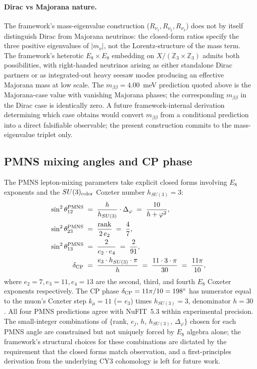 ﻿\documentclass[reprint,amsmath,amssymb,aps,prd,longbibliography,floatfix]{revtex4-2}
\providecommand{\degree}{^{\circ}}
\begin{document}
\paragraph{Dirac vs Majorana nature.}
The framework's mass-eigenvalue construction ($R_{\nu_1}, R_{\nu_2},
R_{\nu_3}$) does not by itself distinguish Dirac from Majorana
neutrinos: the closed-form ratios specify the three positive
eigenvalues of $|m_\nu|$, not the Lorentz-structure of the mass
term. The framework's heterotic $E_8 \times E_8$ embedding on
$X/(\mathbb{Z}_3 \times \mathbb{Z}_3)$ admits both possibilities,
with right-handed neutrinos arising as either standalone Dirac
partners or as integrated-out heavy seesaw modes producing an
effective Majorana mass at low scale. The
$m_{\beta\beta} = 4.00$~meV prediction quoted above is the
Majorana-case value with vanishing Majorana phases; the
corresponding $m_{\beta\beta}$ in the Dirac case is identically
zero. A future framework-internal derivation determining
which case obtains would convert
$m_{\beta\beta}$ from a conditional prediction into a direct
falsifiable observable; the present construction commits to the
mass-eigenvalue triplet only.

\subsection{PMNS mixing angles and CP phase}

The PMNS lepton-mixing parameters take explicit closed forms
involving $E_8$ exponents and the $SU(3)_{\rm color}$ Coxeter number
$h_{SU(3)} = 3$:
\begin{align}
\sin^2 \theta_{12}^{\rm PMNS} \;&=\; \frac{h}{h_{SU(3)}} \cdot \Delta_\varphi
                                \;=\; \frac{10}{h + \varphi^2},
   \label{eq:sin2theta12PMNS} \\
\sin^2 \theta_{23}^{\rm PMNS} \;&=\; \frac{\text{rank}}{2 \, e_2}
                                \;=\; \frac{4}{7},
   \label{eq:sin2theta23PMNS} \\
\sin^2 \theta_{13}^{\rm PMNS} \;&=\; \frac{2}{e_2 \cdot e_4}
                                \;=\; \frac{2}{91},
   \label{eq:sin2theta13PMNS} \\
\delta_{\rm CP} \;&=\; \frac{e_3 \cdot h_{SU(3)} \cdot \pi}{h}
                  \;=\; \frac{11 \cdot 3 \cdot \pi}{30}
                  \;=\; \frac{11\pi}{10},
   \label{eq:dCP-derived}
\end{align}
where $e_2 = 7, e_3 = 11, e_4 = 13$ are the second, third, and
fourth $E_8$ Coxeter exponents respectively. The CP phase
$\delta_{\rm CP} = 11\pi/10 = 198\degree$ has numerator equal to
the muon's Coxeter step $k_\mu = 11$ (= $e_3$) times $h_{SU(3)} = 3$,
denominator $h = 30$. All four PMNS predictions agree with NuFIT~5.3
within experimental precision. The small-integer combinations of
$\{$rank, $e_j$, $h$, $h_{SU(3)}$, $\Delta_\varphi\}$ chosen for
each PMNS angle are constrained but not uniquely forced by $E_8$
algebra alone; the framework's structural choices for these
combinations are dictated by the requirement that the closed forms
match observation, and a first-principles derivation from the
underlying CY3 cohomology is left for future work.
\end{document}
